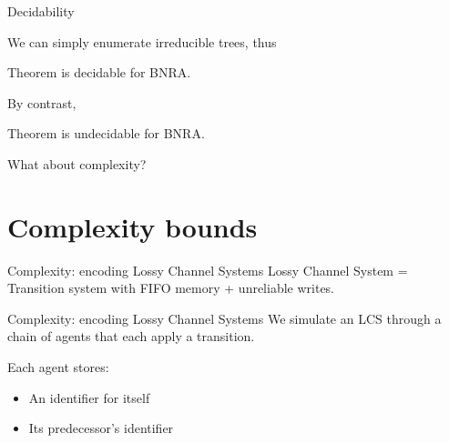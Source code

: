 \documentclass{beamer}
\begin{document}
\begin{comment}
			\begin{itemize}
				\item The length of branches
				
				\item The number of children of nodes
				
				\item The tree
			\end{itemize}
			
		\end{column}
	\end{columns}
	
	\end{frame}

\end{comment}

\begin{frame}{Decidability}
	
	We can simply enumerate irreducible trees, thus
	
	\begin{block}{Theorem}
		{} is decidable for BNRA.
	\end{block}
	
	\pause
	
	By contrast,
	
	\begin{block}{Theorem}
		{} is undecidable for BNRA.
	\end{block}
	
	\pause
	What about complexity?
\end{frame}

\section{Complexity bounds}

\begin{frame}{Complexity: encoding Lossy Channel Systems}
	Lossy Channel System = Transition system with FIFO memory + unreliable writes.\vspace{1cm}
	
	
	
\end{frame}


\begin{frame}{Complexity: encoding Lossy Channel Systems}
	We simulate an LCS through a chain of agents that each apply a transition.
	
	Each agent stores:
	\begin{itemize}
		\item An identifier for itself
		
		\item Its predecessor's identifier
	\end{itemize} 
	
	
	
\end{frame}
\end{document}
